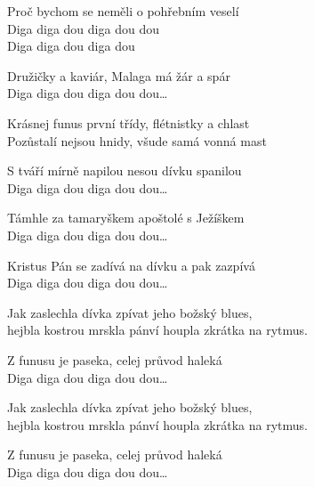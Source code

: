 
\ve{}
Proč bychom se neměli o pohřebním veselí\\
Diga diga dou diga dou dou\\
Diga diga dou diga dou

\ve{}
Družičky a kaviár, Malaga má žár a spár\\
Diga diga dou diga dou dou\ldots{}


\cho{}
Krásnej funus první třídy, flétnistky a chlast\\
Pozůstalí nejsou hnidy, všude samá vonná mast

\ve{}
S tváří mírně napilou nesou dívku spanilou\\
Diga diga dou diga dou dou\ldots{}

\ve{}
Támhle za tamaryškem apoštolé s Ježíškem\\
Diga diga dou diga dou dou\ldots{}

\ve{}
Kristus Pán se zadívá na dívku a pak zazpívá\\
Diga diga dou diga dou dou\ldots{}

\cho{}
Jak zaslechla dívka zpívat jeho božský blues,\\
hejbla kostrou mrskla pánví houpla zkrátka na rytmus.

\ve{}
Z funusu je paseka, celej průvod haleká\\
Diga diga dou diga dou dou\ldots{}

\cho{}
Jak zaslechla dívka zpívat jeho božský blues,\\
hejbla kostrou mrskla pánví houpla zkrátka na rytmus.

\ve{}
Z funusu je paseka, celej průvod haleká\\
Diga diga dou diga dou dou\ldots{}

\esong{}